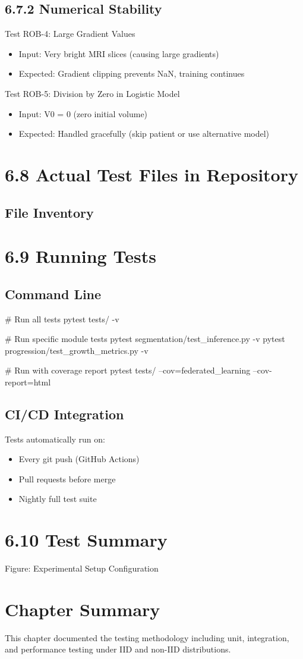 \subsection{6.7.2 Numerical Stability}
Test ROB-4: Large Gradient Values

\begin{itemize}
  \item Input: Very bright MRI slices (causing large gradients)
  \item Expected: Gradient clipping prevents NaN, training continues
\end{itemize}

Test ROB-5: Division by Zero in Logistic Model

\begin{itemize}
  \item Input: V0 = 0 (zero initial volume)
  \item Expected: Handled gracefully (skip patient or use alternative model)
\end{itemize}


\section{6.8 Actual Test Files in Repository}

\subsection{File Inventory}

\section{6.9 Running Tests}

\subsection{Command Line}
\# Run all tests
pytest tests/ -v

\# Run specific module tests
pytest segmentation/test\_inference.py -v
pytest progression/test\_growth\_metrics.py -v

\# Run with coverage report
pytest tests/ --cov=federated\_learning --cov-report=html


\subsection{CI/CD Integration}
Tests automatically run on:

\begin{itemize}
  \item Every git push (GitHub Actions)
  \item Pull requests before merge
  \item Nightly full test suite
\end{itemize}


\section{6.10 Test Summary}
Figure: Experimental Setup Configuration


\section{Chapter Summary}
This chapter documented the testing methodology including unit, integration, and performance testing under IID and non-IID distributions.
